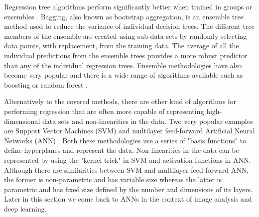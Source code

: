 \medskip

Regression tree algorithms perform significantly better when trained in groups or ensembles \citep{breiman1996bagging}. Bagging, also known as bootstrap aggregation, is an ensemble tree method used to reduce the variance of individual decision trees. The different tree members of the ensemble are created using sub-data sets by randomly selecting data points, with replacement, from the training data. The average of all the individual predictions from the ensemble trees provides a more robust predictor than any of the individual regression trees. Ensemble methodologies have also become very popular and there is a wide range of algorithms available such as boosting or random forest \citep{dietterich2000experimental,breiman2001random}.

\bigskip
\bigskip


\bigskip
\bigskip

Alternatively to the covered methods, there are other kind of algorithms for performing regression that are often more capable of representing high-dimensional data sets and non-linearities in the data. Two very popular examples are Support Vector Machines (SVM) \citep{hearst1998support} and multilayer feed-forward Artificial Neural Networks (ANN) \citep{hornik1989multilayer}. Both these methodologies use a series of "basis functions" to define hyperplanes and represent the data. Non-linearities in the data can be represented by using the "kernel trick" \citep{mika1999fisher} in SVM and activation functions in ANN. Although there are similarities between SVM and multilayer feed-forward ANN, the former is non-parametric and has variable size whereas the latter is parametric and has fixed size defined by the number and dimensions of its layers. Later in this section we come back to ANNs in the context of image analysis and deep learning.

\medskip

